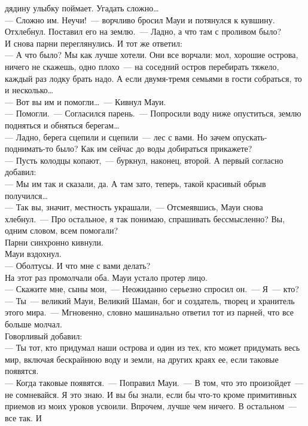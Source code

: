 дядину улыбку поймает. Угадать сложно\ldots\\
--- Сложно им. Неучи!~--- ворчливо бросил Мауи и потянулся к кувшину. Отхлебнул. 
Поставил его на землю.~--- Ладно, а что там с проливом было?\\
И снова парни переглянулись. И тот же ответил:\\
--- А что было? Мы как лучше хотели. Они все ворчали: мол, хорошие острова, 
ничего не скажешь, одно плохо~--- на соседний остров перебирать тяжело, каждый раз 
лодку брать надо. А если двумя-тремя семьями в гости собраться, то и несколько\ldots\\
--- Вот вы им и помогли\ldots~--- Кивнул Мауи.\\
--- Помогли.~--- Согласился парень.~--- Попросили воду ниже опуститься, землю 
подняться и обняться берегам\ldots\\
--- Ладно, берега сцепили и сцепили~--- лес с вами. Но зачем 
опускать-поднимать-то было? Как им сейчас до воды добираться прикажете?\\
--- Пусть колодцы копают,~--- буркнул, наконец, второй. А первый согласно добавил:\\
--- Мы им так и сказали, да. А там зато, теперь, такой красивый обрыв 
получился\ldots\\
--- Так вы, значит, местность украшали,~--- Отсмеявшись, Мауи снова хлебнул.~--- 
Про остальное, я так понимаю, спрашивать бессмысленно? Вы, одним словом, всем 
помогали?\\
Парни синхронно кивнули.\\
Мауи вздохнул.\\
--- Оболтусы. И что мне с вами делать?\\
На этот раз промолчали оба. Мауи устало протер лицо.\\
--- Скажите мне, сыны мои,~--- Неожиданно серьезно спросил он.~--- Я~--- кто?\\
--- Ты~--- великий Мауи, Великий Шаман, бог и создатель, творец и хранитель этого 
мира.~--- Мгновенно, словно машинально ответил тот из парней, что все больше 
молчал.\\
Говорливый добавил:\\
--- Ты тот, кто придумал наши острова и один из тех, кто может придумать весь 
мир, включая бескрайнюю воду и земли, на других краях ее, если таковые появятся.\\
--- Когда таковые появятся.~--- Поправил Мауи.~--- В том, что это произойдет~--- 
не сомневайся. Я это знаю. И вы бы знали, если бы что-то кроме примитивных приемов 
из моих уроков усвоили. Впрочем, лучше чем ничего. В остальном~--- все так. И 
